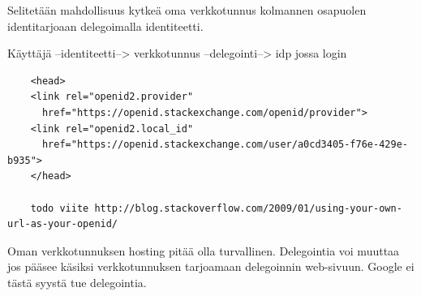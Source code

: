 \documentclass[finnish,gradu]{tktltiki}
\begin{document}
  Selitetään mahdollisuus kytkeä oma verkkotunnus kolmannen osapuolen identitarjoaan delegoimalla identiteetti.

  Käyttäjä --identiteetti--> verkkotunnus --delegointi--> idp jossa login

  \begin{verbatim}
    <head>
    <link rel="openid2.provider"
      href="https://openid.stackexchange.com/openid/provider">
    <link rel="openid2.local_id"
      href="https://openid.stackexchange.com/user/a0cd3405-f76e-429e-b935">
    </head>

    todo viite http://blog.stackoverflow.com/2009/01/using-your-own-url-as-your-openid/
  \end{verbatim}

  Oman verkkotunnuksen hosting pitää olla turvallinen. Delegointia voi muuttaa jos pääsee käsiksi verkkotunnuksen tarjoamaan delegoinnin web-sivuun.
  Google ei tästä syystä tue delegointia.




\end{document}
